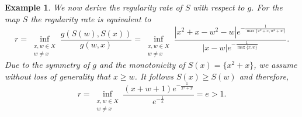 \documentclass{article}
\newcommand{\N}{\mathbb{N}}
\newcommand{\R}{\mathbb{R}}
\newtheorem{examp}[theo]{Example}
\begin{document}
\begin{examp}
 

We now derive the regularity rate of $S$ with respect to $g$. For the map $S$ the regularity rate is equivalent to 
\[\displaystyle r = \inf_{\substack{x, w \in X \\ w \neq x}} \frac{g(S(w), S(x))}{g(w, x)}=\inf_{\substack{x, w \in X \\ w \neq x}}\frac{|x^2+x-w^2-w|e^{-\frac{1}{\max\{x^2+x,w^2+w\}}}}{|x-w|e^{-\frac{1}{\max\{x,w\}}}}.\]
Due to the symmetry of $g$ and the monotonicity of $S(x) = \{x^2 + x\}$, we assume without loss of generality that $x \ge w$. It follows $S(x) \ge S(w)$ and therefore,
\[r=\inf_{\substack{x, w \in X \\ w \neq x}} \frac{(x+w+1)e^{-\frac{1}{x^2+x}}}{e^{-\frac{1}{x}}}=e>1.\]
\end{examp}
\end{document}
